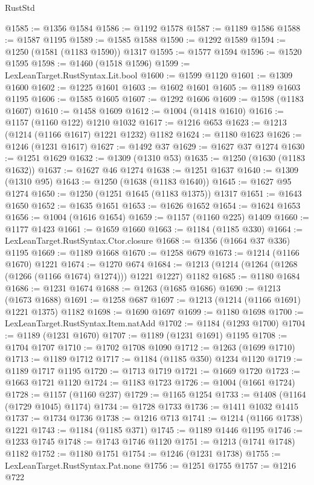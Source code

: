 \begin{lexlean}{RustStd}
\begin{coremodule}
@1585 := @1356 @1584
@1586 := @1192 @1578
@1587 := @1189 @1586
@1588 := @1587 @1195
@1589 := @1585 @1588
@1590 := @1292 @1589
@1594 := @1250 (@1581 (@1183 @1590)) @1317
@1595 := @1577 @1594
@1596 := @1520 @1595
@1598 := @1460 (@1518 @1596)
@1599 := LexLeanTarget.RustSyntax.Lit.bool
@1600 := @1599 @1120
@1601 := @1309 @1600
@1602 := @1225 @1601
@1603 := @1602 @1601
@1605 := @1189 @1603 @1195
@1606 := @1585 @1605
@1607 := @1292 @1606
@1609 := @1598 (@1183 @1607)
@1610 := @1458 @1609
@1612 := @1004 (@1418 @1610)
@1616 := @1157 (@1160 @122) @1210 @1032
@1617 := @1216 @653
@1623 := @1213 (@1214 (@1166 @1617) @1221 @1232) @1182
@1624 := @1180 @1623
@1626 := @1246 (@1231 @1617)
@1627 := @1492 @37
@1629 := @1627 @37 @1274
@1630 := @1251 @1629
@1632 := @1309 (@1310 @53)
@1635 := @1250 (@1630 (@1183 @1632))
@1637 := @1627 @46 @1274
@1638 := @1251 @1637
@1640 := @1309 (@1310 @95)
@1643 := @1250 (@1638 (@1183 @1640))
@1645 := @1627 @95 @1274
@1650 := @1250 (@1251 @1645 (@1183 @1375)) @1317
@1651 := @1643 @1650
@1652 := @1635 @1651
@1653 := @1626 @1652
@1654 := @1624 @1653
@1656 := @1004 (@1616 @1654)
@1659 := @1157 (@1160 @225) @1409
@1660 := @1177 @1423
@1661 := @1659 @1660
@1663 := @1184 (@1185 @330)
@1664 := LexLeanTarget.RustSyntax.Ctor.closure
@1668 := @1356 (@1664 @37 @336) @1195
@1669 := @1189 @1668
@1670 := @1258 @679
@1673 := @1214 (@1166 @1670) @1221
@1674 := @1270 @674
@1684 := @1213 (@1214 (@1264 (@1268 (@1266 (@1166 @1674) @1274))) @1221 @1227) @1182
@1685 := @1180 @1684
@1686 := @1231 @1674
@1688 := @1263 (@1685 @1686)
@1690 := @1213 (@1673 @1688)
@1691 := @1258 @687
@1697 := @1213 (@1214 (@1166 @1691) @1221 @1375) @1182
@1698 := @1690 @1697
@1699 := @1180 @1698
@1700 := LexLeanTarget.RustSyntax.Item.natAdd
@1702 := @1184 (@1293 @1700)
@1704 := @1189 (@1231 @1670)
@1707 := @1189 (@1231 @1691) @1195
@1708 := @1704 @1707
@1710 := @1702 @1708 @1090
@1712 := @1263 (@1699 @1710)
@1713 := @1189 @1712
@1717 := @1184 (@1185 @350) @1234 @1120
@1719 := @1189 @1717 @1195
@1720 := @1713 @1719
@1721 := @1669 @1720
@1723 := @1663 @1721 @1120
@1724 := @1183 @1723
@1726 := @1004 (@1661 @1724)
@1728 := @1157 (@1160 @237)
@1729 := @1165 @1254
@1733 := @1408 (@1164 (@1729 @1045) @1174)
@1734 := @1728 @1733
@1736 := @1411 @1032 @1415
@1737 := @1734 @1736
@1738 := @1216 @713
@1741 := @1214 (@1166 @1738) @1221
@1743 := @1184 (@1185 @371)
@1745 := @1189 @1446 @1195
@1746 := @1233 @1745
@1748 := @1743 @1746 @1120
@1751 := @1213 (@1741 @1748) @1182
@1752 := @1180 @1751
@1754 := @1246 (@1231 @1738)
@1755 := LexLeanTarget.RustSyntax.Pat.none
@1756 := @1251 @1755
@1757 := @1216 @722

\end{coremodule}
\end{lexlean}
